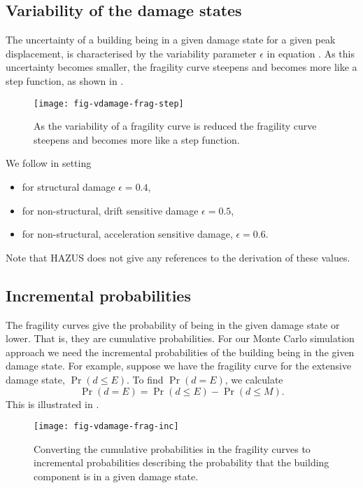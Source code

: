 \subsection{Variability of the damage states}

The uncertainty of a building being in a given damage state for a
given peak displacement, is characterised
by the variability parameter $\epsilon$ in equation
. As this uncertainty becomes smaller, the
fragility curve steepens and becomes more
like a step function, as shown in .

\begin{figure}[htp]
\centering {}
\texttt{[image: fig-vdamage-frag-step]}
\caption{As the variability of a fragility curve is reduced the
  fragility curve steepens and becomes more like a step function.}
\label{fig:vdamage-frag-var}
\end{figure}


We follow \cite{dr_FEMA99b} in setting
\begin{itemize}
\item for structural damage $\epsilon=0.4$, \item for
non-structural, drift sensitive damage $\epsilon=0.5$, \item for
non-structural, acceleration sensitive damage,
  $\epsilon=0.6$.
\end{itemize}
Note that HAZUS does not give any references to the derivation of
these values.


\subsection{Incremental probabilities}

The fragility curves give the probability
of being in the given damage state or lower. That is, they are
cumulative probabilities. For our Monte Carlo simulation approach
we need the incremental probabilities of the building being in the
given damage state. For example,  suppose we have the fragility
curve for the extensive damage state,
$\Pr(d \le E)$. To find $\Pr(d=E)$, we calculate
$$
\Pr(d=E) = \Pr(d\le E) - \Pr(d\le M).
$$
This is illustrated in .

\begin{figure}[htp]
\centering
{}
\texttt{[image: fig-vdamage-frag-inc]}
\caption{Converting the cumulative
  probabilities in the fragility curves to incremental probabilities
  describing the probability that the building component is in a given damage state.}
\label{fig:vdamage-frag-inc}
\end{figure}



